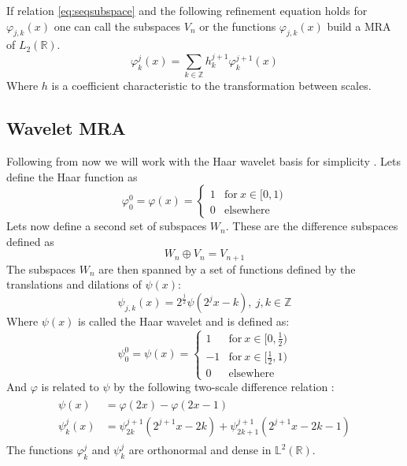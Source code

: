 \documentclass[../master_thesis.tex]{subfiles}
\begin{document}
If relation \ref{eq:seqsubspace} and the following refinement equation holds for $\varphi_{j,k}(x)$
one can call the subspaces $V_n$ or the functions $\varphi_{j,k}(x)$ build a \ac{MRA} of $L_2(\mathbb{R})$.
\begin{equation}
\varphi^j_k(x) = \sum_{k\in\mathbb{Z}} h^{j+1}_k\varphi^{j+1}_k(x)
\end{equation}
Where $h$ is a coefficient characteristic to the transformation between scales.
\subsection{Wavelet \ac{MRA}}
Following from now we will work with the Haar wavelet basis for simplicity \cite{Beylkin:MRA}.
Lets define the Haar function \cite{Schneider:2007} as
\begin{equation}
  \varphi^0_0 = \varphi(x) =
  \begin{cases}
  1 & \text{for} \ x\in [0,1)\\
  0 & \text{elsewhere}
\end{cases}
\end{equation}
Lets now define a second set of subspaces $W_n$. These are the difference subspaces
defined as \cite{Beylkin:MRA, Sorland}
\begin{equation}
  W_n \oplus V_n = V_{n + 1} \label{eq:diffsubspace}
\end{equation}
The subspaces $W_n$ are then spanned by a set of functions defined by the translations and
dilations of $\psi(x)$:
\begin{equation}
  \psi_{j,k}(x) = 2^{\frac{j}{2}}\psi(2^jx - k),\  j,k \in \mathbb{Z} \label{eq:haarwavelet}
\end{equation}
Where $\psi(x)$ is called the Haar wavelet \cite{Schneider:2007} and is defined as:
\begin{equation}
  \psi^0_0 = \psi(x) =
  \begin{cases}
  1 & \text{for} \ x\in [0,\frac{1}{2})\\
  -1 & \text{for}\ x\in [\frac{1}{2}, 1)\\
  0 & \text{elsewhere}
\end{cases}
\end{equation}
And $ \varphi$ is related to $\psi$ by the following two-scale difference relation \cite{Beylkin:MRA, Schneider:2007, Sorland}:
\begin{align}
  \begin{split}\label{eq:2scalewavelet}
    \psi(x) &= \varphi(2x) - \varphi(2x - 1)\\
    \psi^j_k(x) &= \psi^{j+1}_{2k}(2^{j+1}x - 2k) + \psi^{j+1}_{2k+1}(2^{j+1}x - 2k - 1)
  \end{split}
\end{align}
The functions $\varphi^j_k$ and $\psi^j_k$ are orthonormal
and dense \cite{Beylkin:MRA, Sorland, SRJensen:2014} in $\mathbb{L}^2(\mathbb{R})$.
\end{document}
